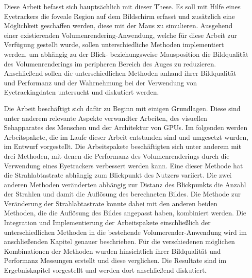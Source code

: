Diese Arbeit befasst sich hauptsächlich mit dieser These.
Es soll mit Hilfe eines Eyetrackers die foveale Region auf dem Bildschirm erfasst und zusätzlich eine Möglichkeit geschaffen werden, diese mit der Maus zu simulieren.
Ausgehend einer existierenden Volumenrendering-Anwendung, welche für diese Arbeit zur Verfügung gestellt wurde, sollen unterschiedliche Methoden implementiert werden, um abhängig zu der Blick- beziehungsweise Mausposition die Bildqualität des Volumenrenderings im peripheren Bereich des Auges zu reduzieren.
Anschließend sollen die unterschiedlichen Methoden anhand ihrer Bildqualität und Performanz und der Wahrnehmung bei der Verwendung von Eyetrackingdaten untersucht und diskutiert werden.

Die Arbeit beschäftigt sich dafür zu Beginn mit einigen Grundlagen. 
Diese sind unter anderem relevante Aspekte verwandter Arbeiten, des visuellen Sehapparates des Menschen und der Architektur von GPUs.
Im folgenden werden Arbeitspakete, die im Laufe dieser Arbeit entstanden sind und umgesetzt wurden, im Entwurf vorgestellt.
Die Arbeitspakete beschäftigten sich unter anderem mit drei Methoden, mit denen die Performanz des Volumenrenderings durch die Verwendung eines Eyetrackers verbessert werden kann.
Eine dieser Methode hat die Strahlabtastrate abhängig zum Blickpunkt des Nutzers variiert.
Die zwei anderen Methoden veränderten abhängig zur Distanz des Blickpunkts die Anzahl der Strahlen und damit die Auflösung des berechneten Bildes.
Die Methode zur Veränderung der Strahlabtastrate konnte dabei mit den anderen beiden Methoden, die die Auflösung des Bildes angepasst haben, kombiniert werden.
Die Integration und Implementierung der Arbeitspakete einschließlich der unterschiedlichen Methoden in die bestehende Volumerender-Anwendung wird im anschließenden Kapitel genauer beschrieben.
Für die verschiedenen möglichen Kombinationen der Methoden wurden hinsichtlich ihrer Bildqualität und Performanz Messungen erstellt und diese verglichen.
Die Resultate sind im Ergebniskapitel vorgestellt und werden dort anschließend diskutiert.